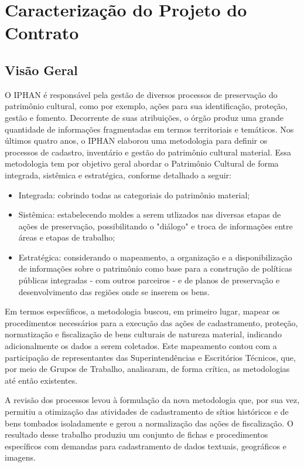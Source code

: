 \section[Caracterização do Projeto Contrato]{Caracterização do Projeto do Contrato}

\subsection[Visão Geral]{Visão Geral}

O IPHAN é responsável pela gestão de diversos processos de preservação do patrimônio cultural, como por exemplo, ações para sua identificação, proteção, gestão e fomento. Decorrente
de suas atribuições, o órgão produz uma grande quantidade de informações fragmentadas em termos territoriais e temáticos. Nos últimos quatro anos, o IPHAN elaborou uma metodologia
para definir os processos de cadastro, inventário e gestão do patrimônio cultural material. Essa metodologia tem por objetivo geral abordar o Patrimônio Cultural de forma integrada, sistêmica
e estratégica, conforme detalhado a seguir:

\begin{itemize}
\item Integrada: cobrindo todas as categoriais do patrimônio material;
\item Sistêmica: estabelecendo moldes a serem utlizados nas diversas etapas de ações de preservação, possibilitando o "diálogo" e troca de informações entre áreas e etapas de trabalho;
\item Estratégica: considerando o mapeamento, a organização e a disponibilização de informações sobre o patrimônio como base para a construção de políticas públicas integradas - com outros parceiros - e de planos de preservação e desenvolvimento das regiões onde se inserem os bens.
\end{itemize}

Em termos especíificos, a metodologia buscou, em primeiro lugar, mapear os procedimentos necessários para a execução das ações de cadastramento, proteção, normatização e fiscalização de bens culturais de natureza material, indicando adicionalmente os dados a serem coletados. Este mapeamento contou com a participação de representantes das Superintendências e Escritórios Técnicos, que, por meio de Grupos de Trabalho, analisaram, de forma crítica, as metodologias até então existentes.

A revisão dos processos levou à formulação da nova metodologia que, por sua vez, permitiu a otimização das atividades de cadastramento de sítios históricos e de bens tombados isoladamente e gerou a normalização das ações de fiscalização. O resultado desse trabalho produziu um conjunto de fichas e procedimentos específicos com demandas para cadastramento de dados textuais, geográficos e imagens.

